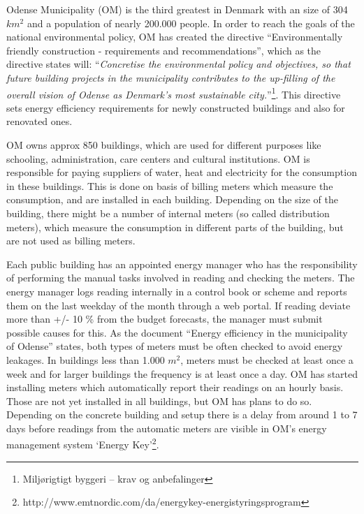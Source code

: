 Odense Municipality (OM) is the third greatest in Denmark with an size of 304 $km^2$ and a population of nearly 200.000 people. In order to reach the goals of the national environmental policy, OM has created the directive “Environmentally friendly construction - requirements and recommendations”,  which as the directive states will: “\emph{Concretise the environmental policy and objectives, so that future building projects in the municipality contributes to the up-filling of the overall vision of Odense as Denmark's most sustainable city.}”\footnote{Miljørigtigt byggeri – krav og anbefalinger}. This directive sets energy efficiency requirements for newly constructed buildings and also for renovated ones.

OM owns approx 850 buildings, which are used for different purposes like schooling, administration, care centers and cultural institutions. OM is responsible for paying suppliers of water, heat and electricity for the consumption in these buildings. This is done on basis of billing meters which measure the consumption, and are installed in each building. Depending on the size of the building, there might be a number of internal meters (so called distribution meters), which measure the consumption in different parts of the building, but are not used as billing meters. 

Each public building has an appointed energy manager who has the responsibility of performing the manual tasks involved in reading and checking the meters. The energy manager logs reading internally in a control book or scheme and reports them on the last weekday of the month through a web portal. If reading deviate more than +/- 10 \% from the budget forecasts, the manager must submit possible causes for this. As the document “Energy efficiency in the municipality of Odense” states, both types of meters must be often checked to avoid energy leakages.  In buildings less than 1.000 $m^2$, meters must be checked at least once a week and for larger buildings the frequency is at least once a day. OM has started installing meters which automatically report their readings on an hourly basis. Those are not yet installed in all buildings, but OM has plans to do so. Depending on the concrete building and setup there is a delay from around 1 to 7 days before readings from the automatic meters are visible in OM’s energy management system ‘Energy Key’\footnote{http://www.emtnordic.com/da/energykey-energistyringsprogram}.

